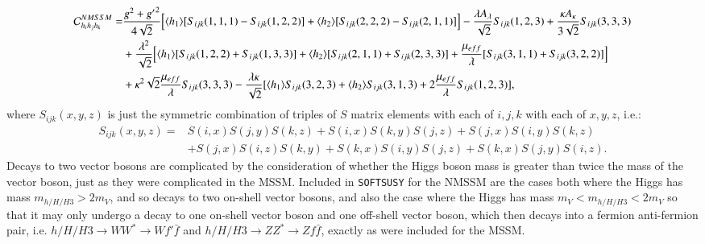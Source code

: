 \documentclass[final,3p,times]{elsarticle}
\begin{document}
\begin{equation}
\begin{aligned}
\mathcal{C}_{h_{i}h_{j}h_{k}}^{NMSSM} = & {g^2 + {g'}^2 \over 4\sqrt{2}}\Big[ \langle h_1 \rangle [S_{ijk}(1,1,1) - S_{ijk}(1,2,2)] + \langle h_2 \rangle [S_{ijk}(2,2,2) - S_{ijk}(2,1,1)]\Big] - {\lambda A_{\lambda} \over \sqrt{2}} S_{ijk}(1,2,3) + {\kappa A_{\kappa} \over 3 \sqrt{2}}S_{ijk}(3,3,3) \\ & + {\lambda^2 \over \sqrt{2}}\Big[ \langle h_1 \rangle [S_{ijk}(1,2,2) + S_{ijk}(1,3,3)] + \langle h_2 \rangle [S_{ijk}(2,1,1) + S_{ijk}(2,3,3)] + {\mu_{eff} \over \lambda}[S_{ijk}(3,1,1)+S_{ijk}(3,2,2)]\Big]\\ & + \kappa^2 \sqrt{2} {\mu_{eff} \over \lambda} S_{ijk}(3,3,3) - {\lambda \kappa \over \sqrt{2}}[\langle h_1 \rangle S_{ijk}(3,2,3) + \langle h_2 \rangle S_{ijk}(3,1,3) + 2{\mu_{eff} \over \lambda}S_{ijk}(1,2,3)],
\end{aligned}
\end{equation}
where $S_{ijk}(x,y,z)$ is just the symmetric combination of triples of $S$ matrix elements with each of $i,j,k$ with each of $x,y,z$, i.e.:
\begin{equation}
\begin{aligned}
S_{ijk}(x,y,z) = & S(i,x)S(j,y)S(k,z) + S(i,x)S(k,y)S(j,z) + S(j,x)S(i,y)S(k,z) \\ & + S(j,x)S(i,z)S(k,y) + S(k,x)S(i,y)S(j,z) + S(k,x)S(j,y)S(i,z).
\end{aligned}
\end{equation}
Decays to two vector bosons are complicated by the consideration of whether the Higgs boson mass is greater than twice the mass of the vector boson, just as they were complicated in the MSSM\@. Included in {\tt SOFTSUSY} for the NMSSM are the cases both where the Higgs has mass $m_{h/H/H3} > 2m_V $, and so decays to two on-shell vector bosons, and also the case where the Higgs has mass $m_V < m_{h/H/H3} < 2m_V$ so that it may only undergo a decay to one on-shell vector boson and one off-shell vector boson, which then decays into a fermion anti-fermion pair, i.e. $h/H/H3 \rightarrow WW^* \rightarrow Wf'\bar{f}$ and $h/H/H3 \rightarrow ZZ^* \rightarrow Zf\bar{f}$, exactly as were included for the MSSM\@.
\end{document}
